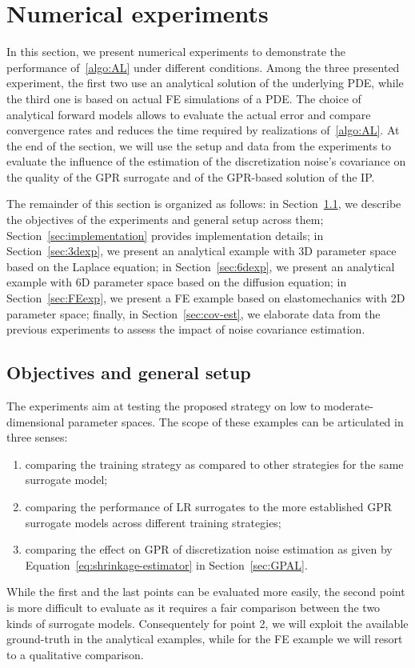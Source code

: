 \section{Numerical experiments}\label{sec:exp}

In this section, we present numerical experiments to demonstrate the performance of~\ref{algo:AL} under different conditions. 
Among the three presented experiment, the first two use an analytical solution of the underlying PDE, while the third one is based on actual FE simulations of a PDE.
The choice of analytical forward models allows to evaluate the actual error and compare convergence rates and reduces the time required by realizations of~\ref{algo:AL}. 
At the end of the section, we will use the setup and data from the experiments to evaluate the influence of the estimation of the discretization noise's covariance on the quality of the GPR surrogate and of the GPR-based solution of the IP.  \medskip 

The remainder of this section is organized as follows: in Section~\ref{sec:setup}, we describe the objectives of the experiments and general setup across them; Section~\ref{sec:implementation} provides implementation details; in Section~\ref{sec:3dexp}, we present an analytical example with 3D parameter space based on the Laplace equation; in Section~\ref{sec:6dexp}, we present an analytical example with 6D parameter space based on the diffusion equation; in Section~\ref{sec:FEexp}, we present a FE example based on elastomechanics with 2D parameter space; finally, in Section~\ref{sec:cov-est}, we elaborate data from the previous experiments to assess the impact of noise covariance estimation.

\subsection{Objectives and general setup}\label{sec:setup}

The experiments aim at testing the proposed strategy on low to moderate-dimensional parameter spaces.
The scope of these examples can be articulated in three senses:
\begin{enumerate}
    \item comparing the training strategy as compared to other strategies for the same surrogate model;
    \item comparing the performance of LR surrogates to the more established GPR surrogate models across different training strategies;
    \item comparing the effect on GPR of discretization noise estimation as given by Equation~\eqref{eq:shrinkage-estimator} in Section~\ref{sec:GPAL}.
\end{enumerate}
While the first and the last points can be evaluated more easily, the second point is more difficult to evaluate as it requires a fair comparison between the two kinds of surrogate models.
Consequentely for point 2, we will exploit the available ground-truth in the analytical examples, while for the FE example we will resort to a qualitative comparison.

